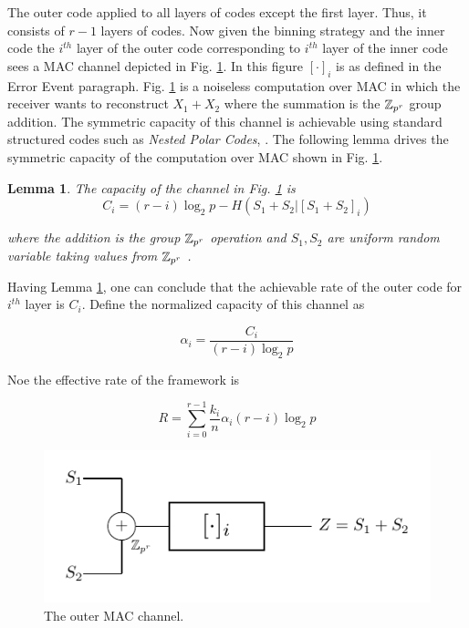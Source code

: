 \documentclass[conference]{IEEEtran}
\theoremstyle{plain}
\newtheorem{lem}{Lemma}
\theoremstyle{definition}
\theoremstyle{remark}
\begin{document}
The outer code applied to all layers of codes except the first layer. Thus, it consists of $r-1$ layers of codes. Now given the binning strategy and the inner code the $i^{th}$ layer of the outer code corresponding to $i^{th}$ layer of the inner code sees a MAC channel depicted in Fig. \ref{fig: outer mac}. In this figure $[\cdot ]_i$ is as defined in the Error Event paragraph. Fig. \ref{fig: outer mac} is a noiseless computation over MAC in which the receiver wants to reconstruct  $X_1+X_2$ where the summation is the $\mathbb{Z}_{p^r}$ group addition. The symmetric capacity of this channel is achievable using standard structured codes such as \textit{Nested Polar Codes}, \cite{Aria-polar}. The following lemma drives the symmetric capacity of the computation over MAC shown in Fig. \ref{fig: outer mac}.


\begin{lem}\label{lem: outer_mac_capacity}
The capacity of the channel in Fig. \ref{fig: outer mac} is 
\begin{equation*}
C_i=(r-i) \log_2 p - H(S_1+S_2|[S_1+S_2]_i)
\end{equation*}

where the addition is the group $\mathbb{Z}_{p^r}$ operation and $S_1, S_2$ are uniform random variable taking values from $\mathbb{Z}_{p^r}$ .
\end{lem} 

Having Lemma \ref{lem: outer_mac_capacity}, one can conclude that the achievable rate of the outer code for $i^{th}$ layer is $C_i$. Define the normalized capacity of this channel as 

\begin{equation*}
\alpha_i =\frac{C_i}{(r-i) \log_2 p}
\end{equation*}

Noe the effective rate of the framework is 

\begin{equation*}
R= \sum_{i=0}^{r-1} \frac{k_i}{n}  \alpha_i (r-i) \log_2 p
\end{equation*}




\begin{figure}
\centering
\includegraphics[scale=1]{sss.pdf} 
%
\caption{The outer MAC channel. }
\label{fig: outer mac}
\end{figure}
\end{document}
